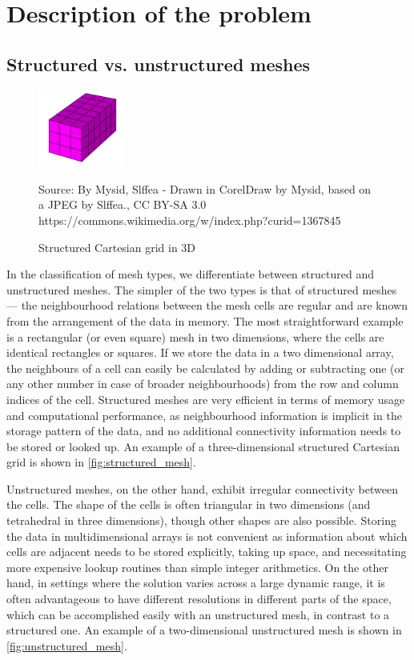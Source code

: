 \documentclass[fontsize=11pt, appendixprefix=true]{scrreprt}
\begin{document}
\section{Description of the problem}

\subsection{Structured vs. unstructured meshes}
\begin{figure}
    \centering
    \includegraphics[width=0.25\textwidth]{structured_mesh}
    \caption{Structured Cartesian grid in 3D}
    \label{fig:structured_mesh}

    \small Source: By Mysid, Slffea - Drawn in CorelDraw by Mysid, based on a %
    JPEG by Slffea., CC BY-SA 3.0 %
    https://commons.wikimedia.org/w/index.php?curid=1367845
\end{figure}

In the classification of mesh types, we differentiate between structured and
unstructured meshes. The simpler of the two types is that of structured meshes
--- the neighbourhood relations between the mesh cells are regular and are known
from the arrangement of the data in memory. The most straightforward example is
a rectangular (or even square) mesh in two dimensions, where the cells are
identical rectangles or squares. If we store the data in a two dimensional
array, the neighbours of a cell can easily be calculated by adding or
subtracting one (or any other number in case of broader neighbourhoods) from the
row and column indices of the cell. Structured meshes are very efficient in
terms of memory usage and computational performance, as neighbourhood
information is implicit in the storage pattern of the data, and no additional
connectivity information needs to be stored or looked up. An example of a
three-dimensional structured Cartesian grid is shown in
\autoref{fig:structured_mesh}.

Unstructured meshes, on the other hand, exhibit irregular connectivity between
the cells. The shape of the cells is often triangular in two dimensions (and
tetrahedral in three dimensions), though other shapes are also possible. Storing
the data in multidimensional arrays is not convenient as information about which
cells are adjacent needs to be stored explicitly, taking up space, and
necessitating more expensive lookup routines than simple integer arithmetics. On
the other hand, in settings where the solution varies across a large dynamic
range, it is often advantageous to have different resolutions in different parts
of the space, which can be accomplished easily with an unstructured mesh, in
contrast to a structured one. An example of a two-dimensional unstructured mesh
is shown in \autoref{fig:unstructured_mesh}.
\end{document}

